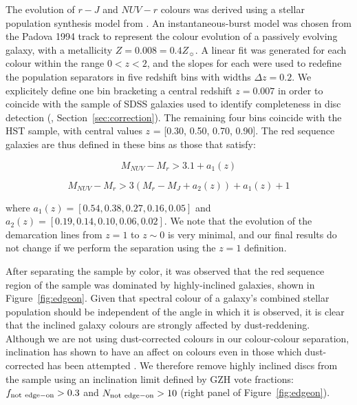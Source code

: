 \documentclass[useAMS,usenatbib]{mn2e}
\begin{document}
The evolution of $r-J$ and $NUV-r$ colours was derived using a stellar population synthesis model from \citet{Bruzual2003}. An instantaneous-burst model was chosen from the Padova 1994 track to represent the colour evolution of a passively evolving galaxy, with a metallicity $Z=0.008=0.4Z_{\sun}$. A linear fit was generated for each colour within the range $0<z<2$, and the slopes for each were used to redefine the population separators in five redshift bins with widths $\Delta z=0.2$. We explicitely define one bin bracketing a central redshift $z=0.007$ in order to coincide with the sample of SDSS galaxies used to identify completeness in disc detection (, Section~\ref{sec:correction}). The remaining four bins coincide with the HST sample, with central values $z$ = [0.30, 0.50, 0.70, 0.90]. The red sequence galaxies are thus defined in these bins as those that satisfy:

\begin{equation}
M_{NUV}-M_{r} > 3.1 + a_{1}(z)
\end{equation}

\begin{equation}
M_{NUV}-M_{r} > 3(M_{r}-M_{J} + a_{2}(z))+ a_{1}(z) + 1  
\end{equation}

\noindent where $a_{1}(z) = [0.54,0.38,0.27,0.16,0.05]$ and $a_{2}(z) = [0.19,0.14,0.10,0.06,0.02]$. 
We note that the evolution of the demarcation lines from $z=1$ to $z\sim0$ is very minimal, and our final results do not change if we perform the separation using the $z=1$ definition.

After separating the sample by color, it was observed that the red sequence region of the sample was dominated by highly-inclined galaxies, shown in Figure~\ref{fig:edgeon}. Given that spectral colour of a galaxy's combined stellar population should be independent of the angle in which it is observed, it is clear that the inclined galaxy colours are strongly affected by dust-reddening. Although we are not using dust-corrected colours in our colour-colour separation, inclination has shown to have an affect on colours even in those which dust-corrected has been attempted \citep{Morselli2016a,Devour2017}. We therefore remove highly inclined discs from the sample using an inclination limit defined by GZH vote fractions: $f_{\rm not~edge-on} > 0.3$ and $N_{\rm not~edge-on}>10$ (right panel of Figure~\ref{fig:edgeon}).  
\end{document}
